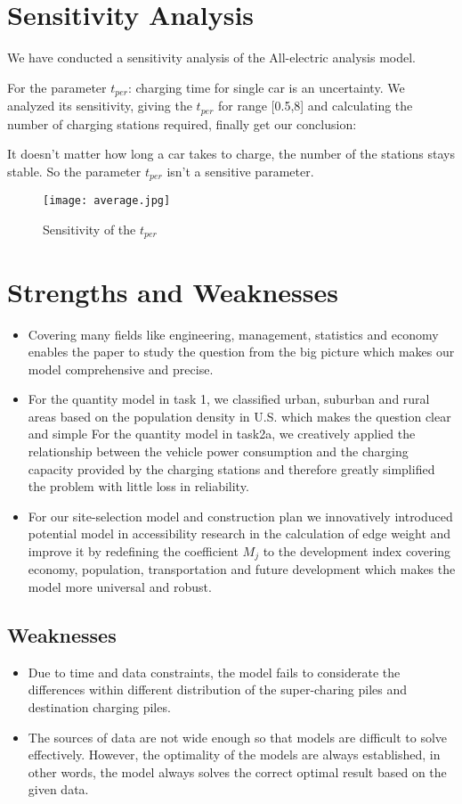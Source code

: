 \documentclass[12pt]{article}  %
\begin{document}
\section{Sensitivity Analysis}
We have conducted a sensitivity analysis of the All-electric analysis model.

For the parameter $t_{per}$: charging time for single car is an uncertainty. We analyzed its sensitivity, giving the $t_{per}$ for range [0.5,8] and calculating the number of charging stations required, finally get our conclusion:

It doesn't matter how long a car takes to charge, the number of the stations stays stable. So the parameter $t_{per}$ isn't a sensitive parameter.



\begin{figure}[H]
	\centering
	\texttt{[image: average.jpg]}
	\caption{Sensitivity of the $t_{per}$}\label{fig:16}
\end{figure}



\section{Strengths and Weaknesses}
\begin{itemize}
	\item Covering many fields like  engineering, management, statistics and economy enables the paper to study the question from the big picture which makes our model comprehensive and precise.
	\item For the quantity model in task 1, we classified urban, suburban and rural areas based on the population density in U.S. which makes the question clear and simple
	For the quantity model in task2a, we creatively applied the relationship between the vehicle power consumption and the charging capacity provided by the charging stations and therefore greatly simplified the problem with little loss in reliability.
	\item For our site-selection model and construction plan we innovatively introduced potential model in accessibility research in the calculation of edge weight and improve it by redefining the coefficient ${M_j}$ to the development index covering economy, population, transportation and future development which makes the model more universal and robust.
\end{itemize}

\subsection{Weaknesses}
\begin{itemize}
	\item Due to time and data constraints, the model fails to considerate the differences within different distribution of the super-charing piles and destination charging piles.
	\item The sources of data are not wide enough so that models are difficult to solve effectively. However, the optimality of the models are always established, in other words, the model always solves the correct optimal result based on the given data. 
\end{itemize}
\end{document}
